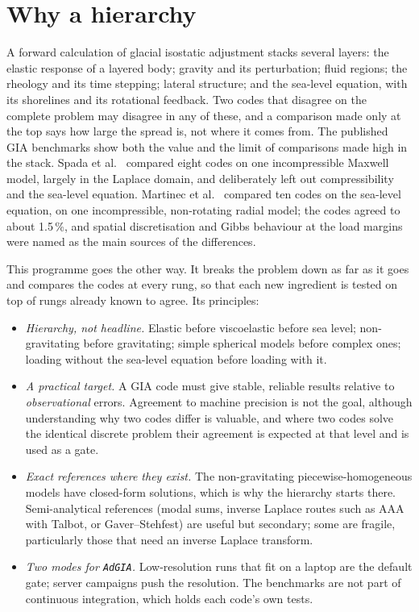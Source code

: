 \documentclass[11pt]{article}
\numberwithin{equation}{section}
\newcommand{\code}[1]{\texttt{#1}}
\begin{document}
\section{Why a hierarchy}
\label{sec:why}

A forward calculation of glacial isostatic adjustment stacks several
layers: the elastic response of a layered body; gravity and its
perturbation; fluid regions; the rheology and its time stepping; lateral
structure; and the sea-level equation, with its shorelines and its
rotational feedback. Two codes that disagree on the complete problem may
disagree in any of these, and a comparison made only at the top says how
large the spread is, not where it comes from. The published GIA benchmarks
show both the value and the limit of comparisons made high in the stack.
Spada et al.\ \cite{Spada2011} compared eight codes on one incompressible
Maxwell model, largely in the Laplace domain, and deliberately left out
compressibility and the sea-level equation. Martinec et al.\
\cite{Martinec2018} compared ten codes on the sea-level equation, on one
incompressible, non-rotating radial model; the codes agreed to about
1.5\,\%, and spatial discretisation and Gibbs behaviour at the load margins
were named as the main sources of the differences.

This programme goes the other way. It breaks the problem down as far as it
goes and compares the codes at every rung, so that each new ingredient is
tested on top of rungs already known to agree. Its principles:
\begin{itemize}[leftmargin=*]
\item \emph{Hierarchy, not headline.} Elastic before viscoelastic before
  sea level; non-gravitating before gravitating; simple spherical models
  before complex ones; loading without the sea-level equation before
  loading with it.
\item \emph{A practical target.} A GIA code must give stable, reliable
  results relative to \emph{observational} errors. Agreement to machine
  precision is not the goal, although understanding why two codes differ
  is valuable, and where two codes solve the identical discrete problem
  their agreement is expected at that level and is used as a gate.
\item \emph{Exact references where they exist.} The non-gravitating
  piecewise-homogeneous models have closed-form solutions, which is why the
  hierarchy starts there. Semi-analytical references (modal sums, inverse
  Laplace routes such as AAA with Talbot, or Gaver--Stehfest) are useful but
  secondary; some are fragile, particularly those that need an inverse
  Laplace transform.
\item \emph{Two modes for \code{AdGIA}.} Low-resolution runs that fit on a
  laptop are the default gate; server campaigns push the resolution.
  The benchmarks are not part of continuous integration, which holds each
  code's own tests.
\end{itemize}
\end{document}
